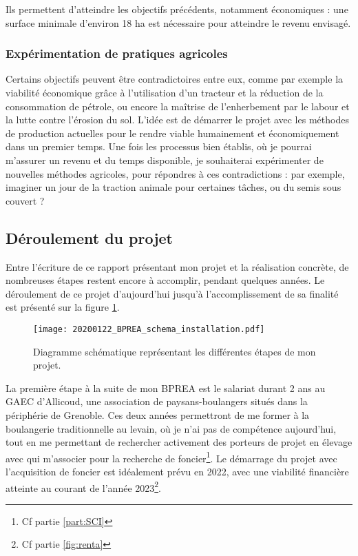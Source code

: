 \documentclass{book}
\begin{document}
Ils permettent d'atteindre les objectifs précédents, notamment économiques : une surface minimale d'environ 18 ha est nécessaire pour atteindre le revenu envisagé.

\subsubsection{Expérimentation de pratiques agricoles}

Certains objectifs peuvent être contradictoires entre eux, comme par exemple la viabilité économique grâce à l'utilisation d'un tracteur et la réduction de la consommation de pétrole, ou encore la maîtrise de l'enherbement par le labour et la lutte contre l'érosion du sol. L'idée est de démarrer le projet avec les méthodes de production actuelles pour le rendre viable humainement et économiquement dans un premier temps.  Une fois les processus bien établis, où je pourrai m'assurer un revenu et du temps disponible, je souhaiterai expérimenter de nouvelles méthodes agricoles, pour répondres à ces contradictions : par exemple, imaginer un jour de la traction animale pour certaines tâches, ou du semis sous couvert ?

\subsection{Déroulement du projet}

Entre l'écriture de ce rapport présentant mon projet et la réalisation concrète, de nombreuses étapes restent encore à accomplir, pendant quelques années. Le déroulement de ce projet d'aujourd'hui jusqu'à l'accomplissement de sa finalité est présenté sur la figure \ref{fig:realisation}.

\begin{figure}[h!]
\begin{center}
	\texttt{[image: 20200122\_BPREA\_schema\_installation.pdf]}
	\caption{Diagramme schématique représentant les différentes étapes de mon projet.}
	\label{fig:realisation}
\end{center}
\end{figure}

La première étape à la suite de mon BPREA est le salariat durant 2 ans au GAEC d'Allicoud, une association de paysans-boulangers situés dans la périphérie de Grenoble. Ces deux années permettront de me former à la boulangerie traditionnelle au levain, où je n'ai pas de compétence aujourd'hui, tout en me permettant de rechercher activement des porteurs de projet en élevage avec qui m'associer pour la recherche de foncier\footnote{Cf partie \ref{part:SCI}}. Le démarrage du projet avec l'acquisition de foncier est idéalement prévu en 2022, avec une viabilité financière atteinte au courant de l'année 2023\footnote{Cf partie \ref{fig:renta}}.
\end{document}
